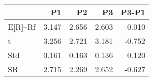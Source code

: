 \begin{tabular}{lrrrr}
\toprule
 & P1 & P2 & P3 & P3-P1 \\
\midrule
E[R]--Rf & 3.147 & 2.656 & 2.603 & -0.010 \\
t & 3.256 & 2.721 & 3.181 & -0.752 \\
Std & 0.161 & 0.163 & 0.136 & 0.120 \\
SR & 2.715 & 2.269 & 2.652 & -0.627 \\
\bottomrule
\end{tabular}
